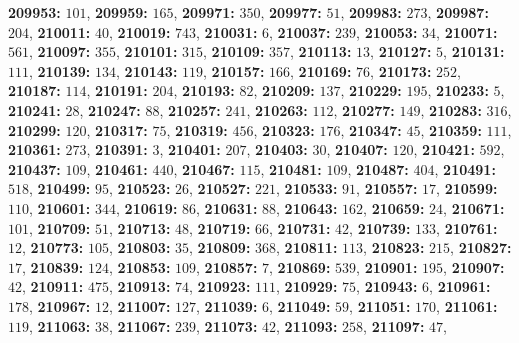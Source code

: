 \textsf{\bfseries 209953:} $101$, \textsf{\bfseries 209959:} $165$, \textsf{\bfseries 209971:} $350$, \textsf{\bfseries 209977:} $51$, \textsf{\bfseries 209983:} $273$, \textsf{\bfseries 209987:} $204$, \textsf{\bfseries 210011:} $40$, \textsf{\bfseries 210019:} $743$, \textsf{\bfseries 210031:} $6$, \textsf{\bfseries 210037:} $239$, \textsf{\bfseries 210053:} $34$, \textsf{\bfseries 210071:} $561$, \textsf{\bfseries 210097:} $355$, \textsf{\bfseries 210101:} $315$, \textsf{\bfseries 210109:} $357$, \textsf{\bfseries 210113:} $13$, \textsf{\bfseries 210127:} $5$, \textsf{\bfseries 210131:} $111$, \textsf{\bfseries 210139:} $134$, \textsf{\bfseries 210143:} $119$, \textsf{\bfseries 210157:} $166$, \textsf{\bfseries 210169:} $76$, \textsf{\bfseries 210173:} $252$, \textsf{\bfseries 210187:} $114$, \textsf{\bfseries 210191:} $204$, \textsf{\bfseries 210193:} $82$, \textsf{\bfseries 210209:} $137$, \textsf{\bfseries 210229:} $195$, \textsf{\bfseries 210233:} $5$, \textsf{\bfseries 210241:} $28$, \textsf{\bfseries 210247:} $88$, \textsf{\bfseries 210257:} $241$, \textsf{\bfseries 210263:} $112$, \textsf{\bfseries 210277:} $149$, \textsf{\bfseries 210283:} $316$, \textsf{\bfseries 210299:} $120$, \textsf{\bfseries 210317:} $75$, \textsf{\bfseries 210319:} $456$, \textsf{\bfseries 210323:} $176$, \textsf{\bfseries 210347:} $45$, \textsf{\bfseries 210359:} $111$, \textsf{\bfseries 210361:} $273$, \textsf{\bfseries 210391:} $3$, \textsf{\bfseries 210401:} $207$, \textsf{\bfseries 210403:} $30$, \textsf{\bfseries 210407:} $120$, \textsf{\bfseries 210421:} $592$, \textsf{\bfseries 210437:} $109$, \textsf{\bfseries 210461:} $440$, \textsf{\bfseries 210467:} $115$, \textsf{\bfseries 210481:} $109$, \textsf{\bfseries 210487:} $404$, \textsf{\bfseries 210491:} $518$, \textsf{\bfseries 210499:} $95$, \textsf{\bfseries 210523:} $26$, \textsf{\bfseries 210527:} $221$, \textsf{\bfseries 210533:} $91$, \textsf{\bfseries 210557:} $17$, \textsf{\bfseries 210599:} $110$, \textsf{\bfseries 210601:} $344$, \textsf{\bfseries 210619:} $86$, \textsf{\bfseries 210631:} $88$, \textsf{\bfseries 210643:} $162$, \textsf{\bfseries 210659:} $24$, \textsf{\bfseries 210671:} $101$, \textsf{\bfseries 210709:} $51$, \textsf{\bfseries 210713:} $48$, \textsf{\bfseries 210719:} $66$, \textsf{\bfseries 210731:} $42$, \textsf{\bfseries 210739:} $133$, \textsf{\bfseries 210761:} $12$, \textsf{\bfseries 210773:} $105$, \textsf{\bfseries 210803:} $35$, \textsf{\bfseries 210809:} $368$, \textsf{\bfseries 210811:} $113$, \textsf{\bfseries 210823:} $215$, \textsf{\bfseries 210827:} $17$, \textsf{\bfseries 210839:} $124$, \textsf{\bfseries 210853:} $109$, \textsf{\bfseries 210857:} $7$, \textsf{\bfseries 210869:} $539$, \textsf{\bfseries 210901:} $195$, \textsf{\bfseries 210907:} $42$, \textsf{\bfseries 210911:} $475$, \textsf{\bfseries 210913:} $74$, \textsf{\bfseries 210923:} $111$, \textsf{\bfseries 210929:} $75$, \textsf{\bfseries 210943:} $6$, \textsf{\bfseries 210961:} $178$, \textsf{\bfseries 210967:} $12$, \textsf{\bfseries 211007:} $127$, \textsf{\bfseries 211039:} $6$, \textsf{\bfseries 211049:} $59$, \textsf{\bfseries 211051:} $170$, \textsf{\bfseries 211061:} $119$, \textsf{\bfseries 211063:} $38$, \textsf{\bfseries 211067:} $239$, \textsf{\bfseries 211073:} $42$, \textsf{\bfseries 211093:} $258$, \textsf{\bfseries 211097:} $47$, 
